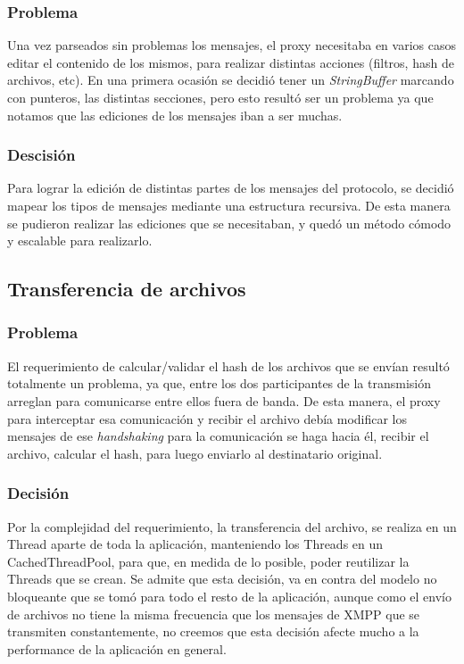 \documentclass[a4paper,10pt]{article}
\begin{document}
\subsubsection{Problema}
Una vez parseados sin problemas los mensajes, el proxy necesitaba en varios casos editar el contenido de los mismos, para realizar distintas
acciones (filtros, hash de archivos, etc). En una primera ocasión se decidió tener un \textit{StringBuffer} marcando con punteros, las distintas
secciones, pero esto resultó ser un problema ya que notamos que las ediciones de los mensajes iban a ser muchas.
\subsubsection{Descisión}
Para lograr la edición de distintas partes de los mensajes del protocolo, se decidió mapear los tipos de mensajes mediante una estructura recursiva.
De esta manera se pudieron realizar las ediciones que se necesitaban, y quedó un método cómodo y escalable para realizarlo.

\subsection{Transferencia de archivos}
\subsubsection{Problema}
El requerimiento de calcular/validar el hash de los archivos que se envían resultó totalmente un problema, ya que, entre los dos participantes
de la transmisión arreglan para comunicarse entre ellos fuera de banda. De esta manera, el proxy para interceptar esa comunicación y recibir
el archivo debía modificar los mensajes de ese \textit{handshaking} para la comunicación se haga hacia él, recibir el archivo, calcular el hash, para luego
enviarlo al destinatario original.
\subsubsection{Decisión}
Por la complejidad del requerimiento, la transferencia del archivo, se realiza en un Thread aparte de toda la aplicación, manteniendo los Threads en un
CachedThreadPool, para que, en medida de lo posible, poder reutilizar la Threads que se crean. Se admite que esta decisión, va en contra del modelo
no bloqueante que se tomó para todo el resto de la aplicación, aunque como el envío de archivos no tiene la misma frecuencia que los mensajes de XMPP
que se transmiten constantemente, no creemos que esta decisión afecte mucho a la performance de la aplicación en general.
\end{document}
